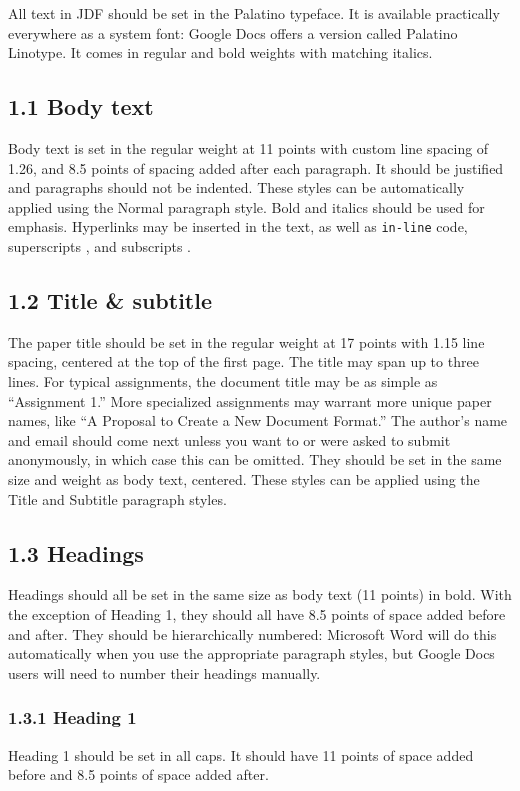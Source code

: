 {{{{All text in JDF should be set in the Palatino typeface. It is available practically everywhere as a system font: Google Docs offers a version called Palatino Linotype. It comes in regular and bold weights with matching italics.

\subsection*{1.1 Body text}
Body text is set in the regular weight at 11 points with custom line spacing of 1.26, and 8.5 points of spacing added after each paragraph. It should be justified and paragraphs should not be indented. These styles can be automatically applied using the Normal paragraph style.
Bold and italics should be used for emphasis. Hyperlinks may be inserted in the text, as well as \texttt{in-line} code, superscripts , and subscripts .

\subsection*{1.2 Title \& subtitle}
The paper title should be set in the regular weight at 17 points with 1.15 line spacing, centered at the top of the first page. The title may span up to three lines. For typical assignments, the document title may be as simple as “Assignment 1.” More specialized assignments may warrant more unique paper names, like “A Proposal to Create a New Document Format.”
The author’s name and email should come next unless you want to or were asked to submit anonymously, in which case this can be omitted. They should be set in the same size and weight as body text, centered. These styles can be applied using the Title and Subtitle paragraph styles.

\subsection*{1.3 Headings}
Headings should all be set in the same size as body text (11 points) in bold. With the exception of Heading 1, they should all have 8.5 points of space added before and after. They should be hierarchically numbered: Microsoft Word will do this automatically when you use the appropriate paragraph styles, but Google Docs users will need to number their headings manually.

\subsubsection*{1.3.1 Heading 1}
Heading 1 should be set in all caps. It should have 11 points of space added before and 8.5 points of space added after.

}}}}
